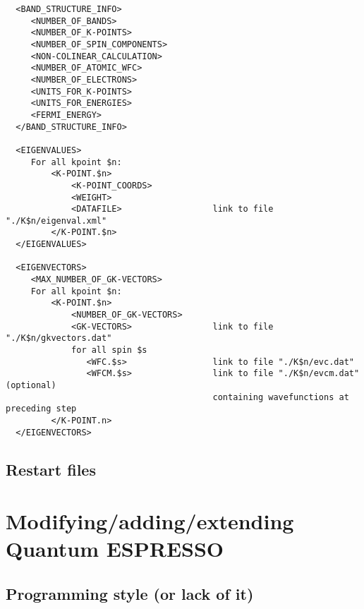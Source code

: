 \documentclass[12pt,a4paper]{article}
\def\qe{{\sc Quantum ESPRESSO}}
\begin{document}
\begin{verbatim}
  <BAND_STRUCTURE_INFO>
     <NUMBER_OF_BANDS>
     <NUMBER_OF_K-POINTS>
     <NUMBER_OF_SPIN_COMPONENTS>
     <NON-COLINEAR_CALCULATION>
     <NUMBER_OF_ATOMIC_WFC>
     <NUMBER_OF_ELECTRONS>
     <UNITS_FOR_K-POINTS>
     <UNITS_FOR_ENERGIES>
     <FERMI_ENERGY>
  </BAND_STRUCTURE_INFO>

  <EIGENVALUES>
     For all kpoint $n:
         <K-POINT.$n>
             <K-POINT_COORDS>
             <WEIGHT>
             <DATAFILE>                  link to file "./K$n/eigenval.xml"
         </K-POINT.$n>
  </EIGENVALUES>

  <EIGENVECTORS>
     <MAX_NUMBER_OF_GK-VECTORS>
     For all kpoint $n:
         <K-POINT.$n>
             <NUMBER_OF_GK-VECTORS>
             <GK-VECTORS>                link to file "./K$n/gkvectors.dat"
             for all spin $s
                <WFC.$s>                 link to file "./K$n/evc.dat"
                <WFCM.$s>                link to file "./K$n/evcm.dat" (optional)
                                         containing wavefunctions at preceding step
         </K-POINT.n>
  </EIGENVECTORS>
\end{verbatim}

\subsection{Restart files}

\section{Modifying/adding/extending \qe}

\subsection{Programming style (or lack of it)}
\end{document}

